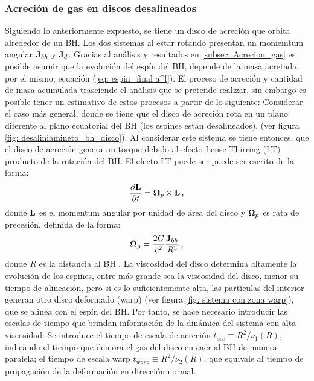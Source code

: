     \subsubsection{Acreción de gas en discos desalineados}
    \label{subsubsec: Acrecion gas desaliniado}
Siguiendo lo anteriormente expuesto, se tiene un disco de acreción que orbita alrededor de un BH. Los dos sistemas al estar rotando presentan un momemtum angular ${\bf{J}}_{bh}$ y ${\bf{J}}_{d}$. Gracias al análisis y resultados en \ref{subsec: Acrecion_gas} es posible asumir que la evolución del espín del BH, depende de la masa acretada por el mismo, ecuación (\ref{eq: espin_final a^f}). El proceso de acreción y cantidad de masa acumulada trasciende el análisis que se pretende realizar, sin embargo es posible tener un estimativo de estos procesos a partir de lo siguiente: Considerar el caso más general, donde se tiene que el disco de acreción rota en un plano diferente al plano ecuatorial del BH (los espines están desalineados), (ver figura \ref{fig: desaliniamineto_bh_disco}). Al considerar este sistema se tiene entonces, que el disco de acreción genera un torque debido al efecto Lense-Thirring (LT) producto de la rotación del BH. El efecto LT puede ser puede ser escrito de la forma:
%
\begin{align}
    \frac{\partial {\bf{L}}}{\partial t}={\bf{\Omega}}_{p}\times{\bf{L}}\,,
    \label{eq: lense-Thirring}
\end{align}
%
donde ${\bf{L}}$ es el momentum angular por unidad de área del disco y ${\bf{\Omega}}_{p}$ es rata de precesión, definida de la forma:
%
\begin{align}
    {\bf{\Omega}}_{p}=\frac{2G}{c^{2}}\frac{{\bf{J}}_{bh}}{R^{3}}\,,
\end{align}
%
donde $R$ es la distancia al BH \cite{pringle1992}. La viscosidad del disco determina altamente la evolución de los espines, entre más grande sea la viscosidad del disco, menor su tiempo de alineación, pero si es lo suficientemente alta, las partículas del interior generan otro disco deformado (warp) (ver figura \ref{fig: sistema con zona warp}), que se alinea con el espín del BH. Por tanto, se hace necesario introducir las escalas de tiempo que brindan información de la dinámica del sistema con alta viscosidad: Se introduce el tiempo de escala de acreción $t_{acc}\equiv R^{2}/\nu_{1}(R)$, indicando el tiempo que demora el gas del disco en caer al BH de manera paralela; el tiempo de escala warp $t_{warp}\equiv R^{2}/\nu_{2}(R)$, que equivale al tiempo de propagación de la deformación en dirección normal.  
